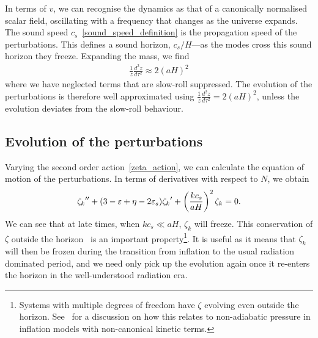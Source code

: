     In terms of $v$, we can recognise the dynamics as that of a
    canonically normalised scalar field, oscillating
    with a frequency that changes as the universe expands.
    The sound speed $c_s$~\eqref{sound_speed_definition} is
    the propagation speed of the perturbations.
    This defines a sound horizon, $c_s/H$---as the modes cross this sound
    horizon they freeze.
    Expanding the mass, we find
    \begin{align}
        \frac{1}{z}\frac{d^2z}{d\tau^2} \approx 2{\left(aH\right)}^2
    \end{align}
    where we have neglected terms that are slow-roll suppressed.
    The evolution of the perturbations is therefore well approximated using
    $\frac{1}{z}\frac{d^2z}{d\tau^2} = 2{\left(aH\right)}^2$,
    unless the evolution deviates from the slow-roll behaviour.

    \subsection{Evolution of the perturbations}\label{pert_evol}
    Varying the second order action~\eqref{zeta_action}, we can calculate the equation of motion
    of the perturbations.
    In terms of derivatives with respect to $N$, we obtain
    \begin{align}\label{modefneqn_zeta_N}
        {\zeta_k}'' + (3-\varepsilon+\eta-2\varepsilon_{s}){\zeta_k}'+\left(\frac{kc_s}{aH}\right)^2\zeta_k=0.
    \end{align}
    We can see that at late times, when $kc_s\ll aH$, $\zeta_k$ will freeze.
    This conservation of $\zeta$ outside the horizon~\cite{Lyth_conserved} is an
    important property\footnote{
    Systems with multiple degrees of freedom have $\zeta$ evolving even outside
    the horizon. See~\cite{Christopherson_2009} for a discussion on how this relates
    to non-adiabatic pressure in inflation models with non-canonical kinetic terms.}.
    It is useful as it means that $\zeta_k$ will then be frozen during the transition from inflation to the
    usual radiation dominated period, and we need only pick up the evolution again once it
    re-enters the horizon in the well-understood radiation era.


